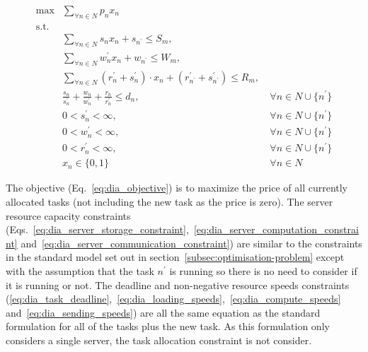 \begin{align}
    \max & \sum_{\forall n \in N} p_n x_n\label{eq:dia_objective}\\
    \mbox{s.t.} \nonumber \\
    & \sum_{\forall n \in N} s_n x_n + s_{n^{'}} \leq S_m,\label{eq:dia_server_storage_constraint}\\
    & \sum_{\forall n \in N} w^{'}_n x_n + w_{n^{'}} \leq W_m, \label{eq:dia_server_computation_constraint}\\
    & \sum_{\forall n \in N} (r^{'}_n + s^{'}_n) \cdot x_n + (r^{'}_{n^{'}} + s^{'}_{n^{'}}) \leq R_m, \label{eq:dia_server_communication_constraint}\\
    & \frac{s_n}{s^{'}_n} + \frac{w_n}{w^{'}_n} + \frac{r_n}{r^{'}_n} \leq d_n, &~ \forall n \in N \cup \{n^{'}\} \label{eq:dia_task_deadline}\\
    & 0 < s^{'}_n < \infty, &~ \forall{n \in N \cup \{n^{'}\}} \label{eq:dia_loading_speeds}\\
    & 0 < w^{'}_n < \infty, &~ \forall{n \in N \cup \{n^{'}\}} \label{eq:dia_compute_speeds}\\
    & 0 < r^{'}_n < \infty, &~ \forall{n \in N \cup \{n^{'}\}} \label{eq:dia_sending_speeds}\\
    & x_n \in \{0,1\} &~ \forall{n \in N} \label{eq:dia_job_allocation}
\end{align}

The objective (Eq.~\eqref{eq:dia_objective}) is to maximize the price of all currently allocated tasks (not including
the new task as the price is zero). The server resource capacity constraints
(Eqs.~\eqref{eq:dia_server_storage_constraint},~\eqref{eq:dia_server_computation_constraint}
and~\eqref{eq:dia_server_communication_constraint}) are similar to the constraints in the standard model set out in
section~\ref{subsec:optimisation-problem} except with the assumption that the task $n^{'}$ is running so there is no
need to consider if it is running or not. The deadline and non-negative resource speeds constraints
(\ref{eq:dia_task_deadline},~\ref{eq:dia_loading_speeds},~\ref{eq:dia_compute_speeds} and~\ref{eq:dia_sending_speeds})
are all the same equation as the standard formulation for all of the tasks plus the new task. As this formulation only
considers a single server, the task allocation constraint is not consider.

